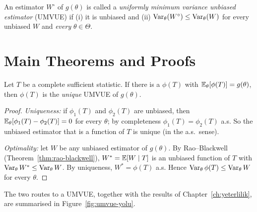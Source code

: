 \documentclass[main.tex]{subfiles}
\begin{document}
\begin{definition}[UMVUE]\label{def:umvue}
An estimator $W^\circ$ of $g(\theta)$ is called a \emph{uniformly minimum variance unbiased estimator} (UMVUE) if (i) it is unbiased and (ii) $\operatorname{Var}_\theta(W^\circ)\le\operatorname{Var}_\theta(W)$ for every unbiased $W$ and \emph{every} $\theta\in\Theta$.
\end{definition}

\section{Main Theorems and Proofs}

\begin{theorem}\label{thm:lehmann-scheffe}
Let $T$ be a complete sufficient statistic. If there is a $\phi(T)$ with $\mathbb{E}_\theta[\phi(T)]=g(\theta)$, then $\phi(T)$ is the \emph{unique} UMVUE of $g(\theta)$.
\end{theorem}
\begin{proof}
\emph{Uniqueness:} if $\phi_1(T)$ and $\phi_2(T)$ are unbiased, then $\mathbb{E}_\theta[\phi_1(T)-\phi_2(T)]=0$ for every $\theta$; by completeness $\phi_1(T)=\phi_2(T)$ a.s. So the unbiased estimator that is a function of $T$ is unique (in the a.s.\ sense).

\emph{Optimality:} let $W$ be any unbiased estimator of $g(\theta)$. By Rao--Blackwell (Theorem~\ref{thm:rao-blackwell}), $W^*=\mathbb{E}[W\mid T]$ is an unbiased function of $T$ with $\operatorname{Var}_\theta W^*\le\operatorname{Var}_\theta W$. By uniqueness, $W^*=\phi(T)$ a.s. Hence $\operatorname{Var}_\theta\phi(T)\le\operatorname{Var}_\theta W$ for every $\theta$.
\end{proof}

The two routes to a UMVUE, together with the results of Chapter~\ref{ch:yeterlilik}, are summarised in Figure~\ref{fig:umvue-yolu}.
\end{document}
